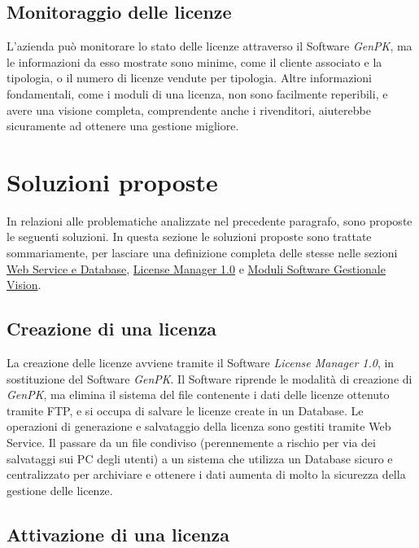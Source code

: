 \subsection{Monitoraggio delle licenze}
L'azienda può monitorare lo stato delle licenze attraverso il Software \textit{GenPK}, ma le informazioni da esso mostrate sono minime, come il cliente associato e la tipologia, o il numero di licenze vendute per tipologia. Altre informazioni fondamentali, come i moduli di una licenza, non sono facilmente reperibili, e avere una visione completa, comprendente anche i rivenditori, aiuterebbe sicuramente ad ottenere una gestione migliore.



\section{Soluzioni proposte}

In relazioni alle problematiche analizzate nel precedente paragrafo, sono proposte le seguenti soluzioni. In questa sezione le soluzioni proposte sono trattate sommariamente, per lasciare una definizione completa delle stesse nelle sezioni {\hyperref[cap:sviluppo-software]{Web Service e Database}}, {\hyperref[cap:license-manager]{License Manager 1.0}} e {\hyperref[cap:moduli-vision]{Moduli Software Gestionale Vision}}.

\subsection{Creazione di una licenza}

La creazione delle licenze avviene tramite il Software \textit{License Manager 1.0}, in sostituzione del Software \textit{GenPK}. Il Software riprende le modalità di creazione di \textit{GenPK}, ma elimina il sistema del file contenente i dati delle licenze ottenuto tramite FTP, e si occupa di salvare le licenze create in un Database. Le operazioni di generazione e salvataggio della  licenza sono gestiti tramite Web Service. 
Il passare da un file condiviso (perennemente a rischio per via dei salvataggi sui PC degli utenti) a un sistema che utilizza un Database sicuro e centralizzato per archiviare e ottenere i dati aumenta di molto la sicurezza della gestione delle licenze.

\subsection{Attivazione di una licenza}

